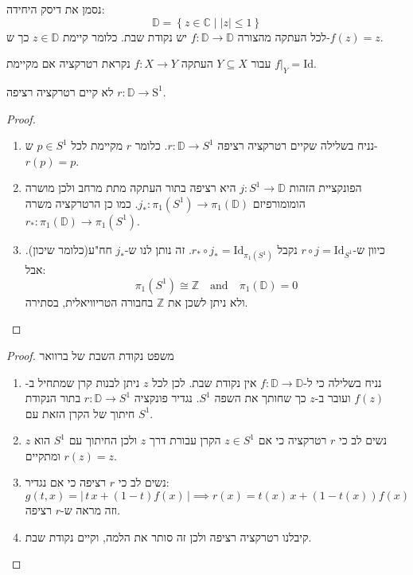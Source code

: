 \documentclass{tstextbook}
\begin{document}
\begin{theorem}
נסמן את דיסק היחידה:
$$\mathbb{D} = \left\{  z \in \mathbb{C} \mid \lvert z \rvert \leq 1 \right\}$$
לכל העתקה מהצורה \(f:\mathbb{D}\to \mathbb{D}\) יש נקודת שבת. כלומר קיימת \(z \in \mathbb{D}\) כך ש-\(f(z)=z\).

\end{theorem}
\begin{definition}[רטרקציה]
עבור \(Y\subseteq X\) העתקה \(f:X\to Y\) נקראת רטרקציה אם מקיימת \(f|_{Y}=\mathrm{Id}\). 

\end{definition}
\begin{lemma}
לא קיים רטרקציה רציפה \(r:\mathbb{D}\to \mathrm{S^{1}}\).

\end{lemma}
\begin{proof}
  \begin{enumerate}
    \item נניח בשלילה שקיים רטרקציה רציפה \(r:\mathbb{D}\to S^{1}\). כלומר \(r\) מקיימת לכל \(p \in S^{1}\) ש-\(r(p)=p\). 


    \item הפונקציית הזהות \(j:S^{1}\to \mathbb{D}\) היא רציפה בתור העתקה מתת מרחב ולכן מושרה הומומורפיזם \(j_{*}:\pi_{1}(S^{1})\to \pi_{1}\left( \mathbb{D} \right)\). כמו כן הרטרקציה משרה \(r_{*}:\pi_{1}\left( \mathbb{D} \right)\to\pi_{1}(S^{1})\). 


    \item כיוון ש-\(r\circ j = \mathrm{Id}_{S^{1}}\) נקבל \(r_{*}\circ j_{*}=\mathrm{Id}_{\pi_{1}(S^{1})}\). זה נותן לנו ש-\(j_{*}\) חח"ע(כלומר שיכון). אבל: 
$$\pi_{1}(S^{1})\cong\mathbb{Z}\quad{\mathrm{and}}\quad\pi_{1}({{{\mathbb{D}}}})=0$$
ולא ניתן לשכן את \(\mathbb{Z}\) בחבורה הטריוויאלית, בסתירה.


  \end{enumerate}
\end{proof}
\begin{proof}
משפט נקודת השבת של ברוואר

  \begin{enumerate}
    \item נניח בשלילה כי ל-\(f:\mathbb{D\to D}\) אין נקודת שבת. לכן לכל \(z\) ניתן לבנות קרן שמתחיל ב-\(f(z)\) ועובר ב-\(z\) כך שחותך את השפה \(S^{1}\). נגדיר פונקציה \(r:\mathbb{D}\to S^{1}\) בתור הנקודת חיתוך של הקרן הזאת עם \(S^{1}\). 


    \item נשים לב כי \(r\) רטרקציה כי אם \(z \in S^{1}\) הקרן עבורת דרך \(z\) ולכן החיתוך עם \(S^{1}\) הוא \(z\) ומתקיים \(r(z)=z\). 


    \item נשים לב כי \(r\) רציפה כי אם נגדיר: 
$$g(t,x)=|\,t\,x+(1-t)f(x)\,|\implies r(x)=t(x)\,x+(1-t(x))f(x)$$
וזה מראה ש-\(r\) רציפה.


    \item קיבלנו רטרקציה רציפה ולכן זה סותר את הלמה, וקיים נקודת שבת. 


  \end{enumerate}
\end{proof}
\end{document}
